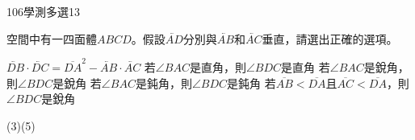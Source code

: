 \begin{QUESTIONS}
\begin{QUESTION}
\begin{QSOL}
        \end{QSOL}
        \begin{QEMPTYSPACE}
        \end{QEMPTYSPACE}
    \end{QUESTION}
    \begin{QUESTION}
        \begin{ExamInfo}{106}{學測}{多選}{13}
        \end{ExamInfo}
        \begin{QBODY}
            空間中有一四面體$ABCD$。假設$\lvec{AD}$分別與$\lvec{AB}$和$\lvec{AC}$垂直，請選出正確的選項。
        \begin{QOPS}
            \QOP $\lvec{DB}\cdot\lvec{DC} ={{\overline{DA}}^{2}}- \lvec{AB}\cdot \lvec{AC}$
            \QOP 若$\angle BAC$是直角，則$\angle BDC$是直角
            \QOP 若$\angle BAC$是銳角，則$\angle BDC$是銳角
            \QOP 若$\angle BAC$是鈍角，則$\angle BDC$是鈍角
            \QOP 若$\overline{AB}<\overline{DA}$且$\overline{AC}<\overline{DA}$，則$\angle BDC$是銳角
        \end{QOPS}
        \end{QBODY}
        \begin{QFROMS}
        \end{QFROMS}
        \begin{QTAGS}
        \end{QTAGS}
        \begin{QANS}
            (3)(5)
        \end{QANS}
        \begin{QSOL}
        \end{QSOL}
        \begin{QEMPTYSPACE}
        \end{QEMPTYSPACE}
    \end{QUESTION}

\end{QUESTIONS}